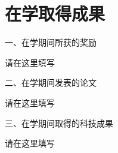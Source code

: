 {\centering\chapter*{在学取得成果}}

\noindent 一、在学期间所获的奖励

请在这里填写

\noindent 二、在学期间发表的论文 

请在这里填写

\noindent 三、在学期间取得的科技成果

请在这里填写
